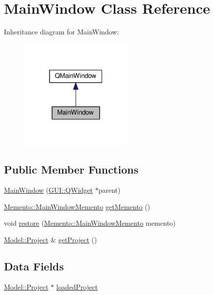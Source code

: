 \hypertarget{classGUI_1_1MainWindow}{}\section{Main\+Window Class Reference}
\label{classGUI_1_1MainWindow}


Inheritance diagram for Main\+Window\+:
\nopagebreak
\begin{figure}[H]
\begin{center}
\leavevmode
\includegraphics[width=160pt]{classGUI_1_1MainWindow__inherit__graph}
\end{center}
\end{figure}
\subsection*{Public Member Functions}
\begin{DoxyCompactItemize}
\item 
\hyperlink{classGUI_1_1MainWindow_aafaf72c52e0a059620d80026737865b4}{Main\+Window} (\hyperlink{classGUI_1_1QWidget}{G\+U\+I\+::\+Q\+Widget} $\ast$parent)
\item 
\hyperlink{classMemento_1_1MainWindowMemento}{Memento\+::\+Main\+Window\+Memento} \hyperlink{classGUI_1_1MainWindow_ae085d92d1c5bec057a813bd86bc20fa4}{get\+Memento} ()
\item 
void \hyperlink{classGUI_1_1MainWindow_a72db05f1394dbeeb2a76b74d8f65917b}{restore} (\hyperlink{classMemento_1_1MainWindowMemento}{Memento\+::\+Main\+Window\+Memento} memento)
\item 
\hyperlink{classModel_1_1Project}{Model\+::\+Project} \& \hyperlink{classGUI_1_1MainWindow_a0e9fe41bc141b89f4955329b959310eb}{get\+Project} ()
\end{DoxyCompactItemize}
\subsection*{Data Fields}
\begin{DoxyCompactItemize}
\item 
\hyperlink{classModel_1_1Project}{Model\+::\+Project} $\ast$ \hyperlink{classGUI_1_1MainWindow_a870e96d05ee2e8c616461952d01ac408}{loaded\+Project}
\end{DoxyCompactItemize}
